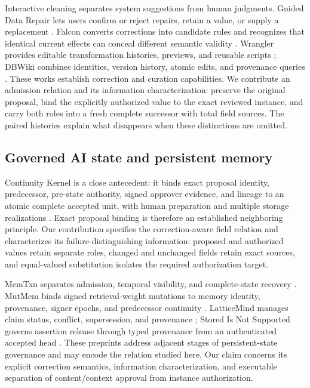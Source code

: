 Interactive cleaning separates system suggestions from human judgments. Guided Data Repair lets users confirm or reject repairs, retain a value, or supply a replacement \citep{yakout2011guided}. Falcon converts corrections into candidate rules and recognizes that identical current effects can conceal different semantic validity \citep{he2016falcon}. Wrangler provides editable transformation histories, previews, and reusable scripts \citep{kandel2011wrangler}; DBWiki combines identities, version history, atomic edits, and provenance queries \citep{buneman2011dbwiki}. These works establish correction and curation capabilities. We contribute an admission relation and its information characterization: preserve the original proposal, bind the explicitly authorized value to the exact reviewed instance, and carry both roles into a fresh complete successor with total field sources. The paired histories explain what disappears when these distinctions are omitted.

\subsection{Governed AI state and persistent memory}
Continuity Kernel is a close antecedent: it binds exact proposal identity, predecessor, pre-state authority, signed approver evidence, and lineage to an atomic complete accepted unit, with human preparation and multiple storage realizations \citep{he2026continuity}. Exact proposal binding is therefore an established neighboring principle. Our contribution specifies the correction-aware field relation and characterizes its failure-distinguishing information: proposed and authorized values retain separate roles, changed and unchanged fields retain exact sources, and equal-valued substitution isolates the required authorization target.

MemTxn separates admission, temporal visibility, and complete-state recovery \citep{cui2026memtxn}. MutMem binds signed retrieval-weight mutations to memory identity, provenance, signer epochs, and predecessor continuity \citep{saidi2026mutmem}. LatticeMind manages claim status, conflict, supersession, and provenance \citep{zhou2026latticemind}; Stored Is Not Supported governs assertion release through typed provenance from an authenticated accepted head \citep{he2026stored}. These preprints address adjacent stages of persistent-state governance and may encode the relation studied here. Our claim concerns its explicit correction semantics, information characterization, and executable separation of content/context approval from instance authorization.

